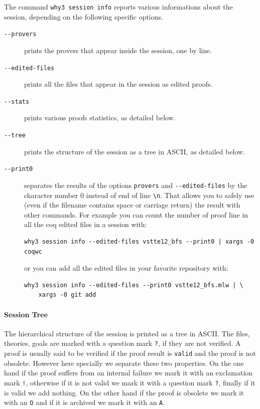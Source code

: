 The command \texttt{why3 session info} reports various informations
about the session, depending on the following specific options.
\begin{description}
\item[\texttt{-{}-provers}] prints the provers that appear inside
  the session, one by line.
\item[\texttt{-{}-edited-files}] prints all the files that appear in
  the session as edited proofs.
\item[\texttt{-{}-stats}] prints various proofs statistics, as
  detailed below.
\item[\texttt{-{}-tree}] prints the structure of the session as a
  tree in ASCII, as detailed below.
\item[\texttt{-{}-print0}] separates the results of the options
  \verb|provers| and \verb|--edited-files| by the character number 0
  instead of end of line \verb|\n|. That allows you to safely use
  (even if the filename contains space or carriage return) the result
  with other commands. For example you can count the number of proof
  line in all the coq edited files in a session with:
\begin{verbatim}
why3 session info --edited-files vstte12_bfs --print0 | xargs -0 coqwc
\end{verbatim}
  or you can add all the edited files in your favorite repository
  with:
\begin{verbatim}
why3 session info --edited-files --print0 vstte12_bfs.mlw | \
    xargs -0 git add
\end{verbatim}

\end{description}

\paragraph{Session Tree}

The hierarchical structure of the session is printed as a tree in
ASCII. The files, theories, goals are marked with a question mark
\verb|?|, if they are not verified. A proof is usually said to be
verified if the proof result is \verb|valid| and the proof is not
obsolete.
However here specially we separate these two properties. On
the one hand if the proof suffers from an internal failure we mark it
with an exclamation mark \verb|!|, otherwise if it is not valid we
mark it with a question mark \verb|?|, finally if it is valid we add
nothing. On the other hand if the proof is obsolete we mark it with an
\verb|O| and if it is \todo{obsolete} archived we mark it with an \verb|A|.

